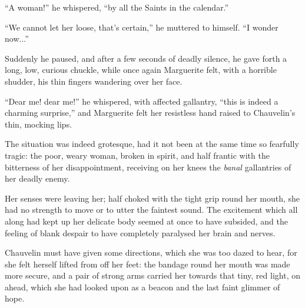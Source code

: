 \enquote{A woman!} he whispered, \enquote{by all the Saints in the calendar.}

\enquote{We cannot let her loose, that's certain,} he muttered to himself. \enquote{I wonder now...}

Suddenly he paused, and after a few seconds of deadly silence, he gave forth a long, low, curious chuckle, while once again Marguerite felt, with a horrible shudder, his thin fingers wandering over her face.

\enquote{Dear me! dear me!} he whispered, with affected gallantry, \enquote{this is indeed a charming surprise,} and Marguerite felt her resistless hand raised to Chauvelin's thin, mocking lips.

The situation was indeed grotesque, had it not been at the same time so fearfully tragic: the poor, weary woman, broken in spirit, and half frantic with the bitterness of her disappointment, receiving on her knees the \textit{banal} gallantries of her deadly enemy.

Her senses were leaving her; half choked with the tight grip round her mouth, she had no strength to move or to utter the faintest sound. The excitement which all along had kept up her delicate body seemed at once to have subsided, and the feeling of blank despair to have completely paralysed her brain and nerves.

Chauvelin must have given some directions, which she was too dazed to hear, for she felt herself lifted from off her feet: the bandage round her mouth was made more secure, and a pair of strong arms carried her towards that tiny, red light, on ahead, which she had looked upon as a beacon and the last faint glimmer of hope.

